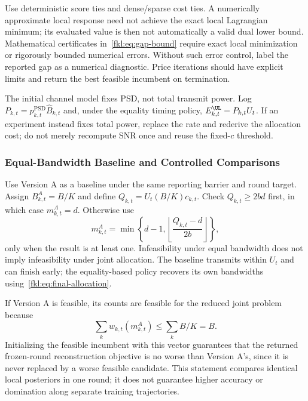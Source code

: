 Use deterministic score ties and dense/sparse cost ties. A numerically approximate local response need not achieve the exact local Lagrangian minimum; its evaluated value is then not automatically a valid dual lower bound. Mathematical certificates in~\eqref{fkl:eq:gap-bound} require exact local minimization or rigorously bounded numerical errors. Without such error control, label the reported gap as a numerical diagnostic. Price iterations should have explicit limits and return the best feasible incumbent on termination.

The initial channel model fixes PSD, not total transmit power. Log $P_{k,t}=p_{k,t}^{\mathrm{PSD}}\widehat B_{k,t}$ and, under the equality timing policy, $E_{k,t}^{\UL}=P_{k,t}U_t$. If an experiment instead fixes total power, replace the rate and rederive the allocation cost; do not merely recompute SNR once and reuse the fixed-$c$ threshold.

\subsubsection{Equal-Bandwidth Baseline and Controlled Comparisons}
Use Version A as a baseline under the same reporting barrier and round target. Assign $B_{k,t}^{A}=B/K$ and define $Q_{k,t}=U_t(B/K)c_{k,t}$. Check $Q_{k,t}\ge2bd$ first, in which case $m_{k,t}^{A}=d$. Otherwise use
\begin{equation}
 m_{k,t}^{A}
 =\min\left\{d-1,
 \left\lfloor\frac{Q_{k,t}-d}{2b}\right\rfloor\right\},
 \label{fkl:eq:version-a}
\end{equation}
only when the result is at least one. Infeasibility under equal bandwidth does not imply infeasibility under joint allocation. The baseline transmits within $U_t$ and can finish early; the equality-based policy recovers its own bandwidths using~\eqref{fkl:eq:final-allocation}.

If Version A is feasible, its counts are feasible for the reduced joint problem because
\begin{equation}
 \sum_kw_{k,t}(m_{k,t}^{A})\le\sum_k B/K=B.
 \label{fkl:eq:baseline-incumbent}
\end{equation}
Initializing the feasible incumbent with this vector guarantees that the returned frozen-round reconstruction objective is no worse than Version A's, since it is never replaced by a worse feasible candidate. This statement compares identical local posteriors in one round; it does not guarantee higher accuracy or domination along separate training trajectories.

